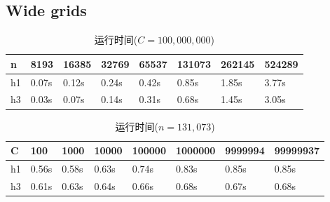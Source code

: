 \subsection{Wide grids}
\begin{table}[H]
  \caption{运行时间($C=100,000,000$)}
  \centering
  \begin{tabular}{p{1.5cm}<{\centering}p{1.5cm}<{\centering}p{1.5cm}<{\centering}p{1.5cm}<{\centering}p{1.5cm}<{\centering}p{1.5cm}<{\centering}p{1.5cm}<{\centering}p{1.5cm}<{\centering}}
  \toprule
   n & 8193 & 16385 & 32769 & 65537 & 131073 &262145 &524289\\
  \midrule
   h1  & 0.07s & 0.12s & 0.24s & 0.42s & 0.85s & 1.85s & 3.77s \\
   h3  & 0.03s & 0.07s & 0.14s & 0.31s & 0.68s & 1.45s & 3.05s \\
  \bottomrule
  \end{tabular} 
\end{table}
\begin{table}[H]
  \caption{运行时间($n=131,073$)}
  \label{tab25}
  \centering
  \begin{tabular}{p{1.5cm}<{\centering}p{1.5cm}<{\centering}p{1.5cm}<{\centering}p{1.5cm}<{\centering}p{1.5cm}<{\centering}p{1.5cm}<{\centering}p{1.5cm}<{\centering}p{1.5cm}<{\centering}}
  \toprule
   C & 100 & 1000 & 10000 & 100000 & 1000000 &9999994 & 99999937\\
  \midrule
   h1  & 0.56s & 0.58s & 0.63s & 0.74s & 0.83s & 0.85s & 0.85s \\
   h3  & 0.61s & 0.63s & 0.64s & 0.66s & 0.68s & 0.67s & 0.68s \\
  \bottomrule
  \end{tabular} 
\end{table}
